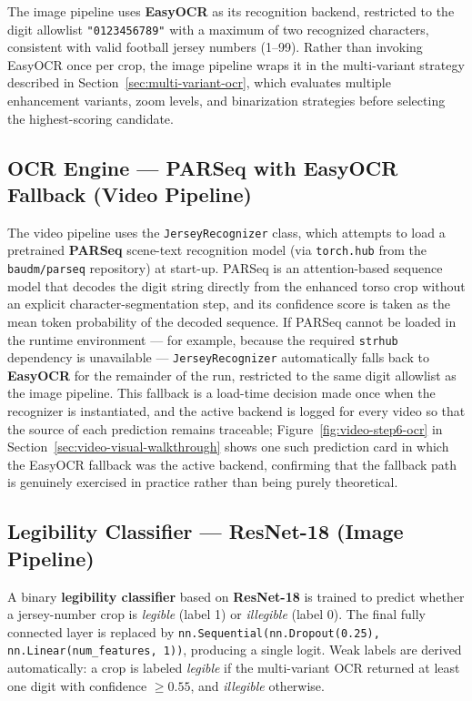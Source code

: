 The image pipeline uses \textbf{EasyOCR} as its recognition backend,
restricted to the digit allowlist \texttt{"0123456789"} with a maximum
of two recognized characters, consistent with valid football jersey
numbers (1--99). Rather than invoking EasyOCR once per crop, the image
pipeline wraps it in the multi-variant strategy described in
Section~\ref{sec:multi-variant-ocr}, which evaluates multiple
enhancement variants, zoom levels, and binarization strategies before
selecting the highest-scoring candidate.

\subsection{OCR Engine --- PARSeq with EasyOCR Fallback (Video Pipeline)}

The video pipeline uses the \texttt{JerseyRecognizer} class, which
attempts to load a pretrained \textbf{PARSeq} scene-text recognition
model \cite{bautista2022parseq} (via \texttt{torch.hub} from the
\texttt{baudm/parseq} repository) at start-up. PARSeq is an
attention-based sequence model that decodes the digit string directly
from the enhanced torso crop without an explicit character-segmentation
step, and its confidence score is taken as the mean token probability
of the decoded sequence. If PARSeq cannot be loaded in the runtime
environment --- for example, because the required \texttt{strhub}
dependency is unavailable --- \texttt{JerseyRecognizer} automatically
falls back to \textbf{EasyOCR} for the remainder of the run, restricted
to the same digit allowlist as the image pipeline. This fallback is a
load-time decision made once when the recognizer is instantiated, and
the active backend is logged for every video so that the source of
each prediction remains traceable; Figure~\ref{fig:video-step6-ocr} in
Section~\ref{sec:video-visual-walkthrough} shows one such prediction
card in which the EasyOCR fallback was the active backend, confirming
that the fallback path is genuinely exercised in practice rather than
being purely theoretical.

\subsection{Legibility Classifier --- ResNet-18 (Image Pipeline)}

A binary \textbf{legibility classifier} based on \textbf{ResNet-18}
is trained to predict whether a jersey-number crop is \textit{legible}
(label 1) or \textit{illegible} (label 0). The final fully connected
layer is replaced by \texttt{nn.Sequential(nn.Dropout(0.25),
nn.Linear(num\_features, 1))}, producing a single logit. Weak labels
are derived automatically: a crop is labeled \textit{legible} if the
multi-variant OCR returned at least one digit with confidence
$\geq 0.55$, and \textit{illegible} otherwise.

